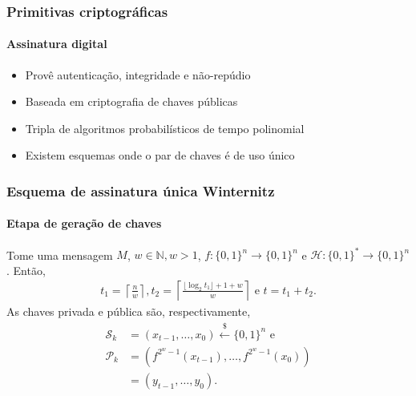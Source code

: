 \documentclass[12pt]{beamer}
\newcommand{\hh}{\mathcal{H}}
\newcommand{\pk}{\mathcal{P}_k}
\newcommand{\sk}{\mathcal{S}_k}
\newcommand{\binwds}[1]{\{0, 1\}^{#1}}
\newcommand{\fhash}[1]{\hh{}: \binwds{*} \longrightarrow{} \binwds{#1}}
\newcommand{\random}{\stackrel{\$}{\longleftarrow}}
\begin{document}
\begin{frame}
  \frametitle{Primitivas criptográficas}
  \framesubtitle{Assinatura digital}
  \begin{itemize}
    \item Provê autenticação, integridade e não-repúdio
    \item Baseada em criptografia de chaves públicas
    \item Tripla de algoritmos probabilísticos
      de tempo polinomial~\cite{Goldreich:book:2004}
  \end{itemize}
  \begin{figure}
    \centering
  \end{figure}
  \begin{itemize}
    \item Existem esquemas onde o par de chaves é de uso único
  \end{itemize}
\end{frame}

\begin{frame}
  \frametitle{Esquema de assinatura única Winternitz}
  \framesubtitle{Etapa de geração de chaves}
  Tome uma mensagem $M$, $w \in \mathbb{N}, w > 1$,
  $f : \binwds{n} \longrightarrow \binwds{n}$ e $\fhash{n}$. Então,
  \begin{align*}
    t_1 = \left\lceil \frac{n}{w} \right\rceil,
    t_2 = \left\lceil \frac{\lfloor \log_2 t_1 \rfloor + 1 + w}{w} \right\rceil
    \text{ e } t = t_1 + t_2.
  \end{align*}
  As chaves privada e pública são, respectivamente,
  \begin{align*}
    \sk{} &= (x_{t - 1}, \dots, x_{0}) \random{} \binwds{n} \text{ e}\\
    \pk{} &= (f^{2^w - 1}(x_{t - 1}), \dots, f^{2^w - 1}(x_0)) \\
          &= (y_{t - 1}, \dots, y_0).
   \end{align*}
\end{frame}
\end{document}
